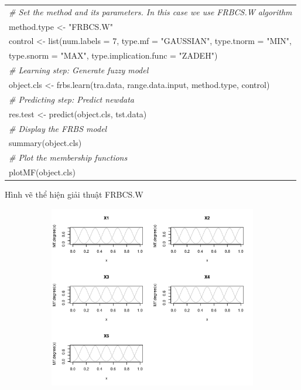 \documentclass[a4paper, 13pt]{report}
\begin{document}
\begin{enumerate}[label=\textbf{PL\arabic*}]
\begin{flushleft}
\begin{tabular}{  |l| }
\textit{\# Set the method and its parameters. In this case we use FRBCS.W algorithm}\\
method.type <- "FRBCS.W"\\
control <- list(num.labels = 7, type.mf = "GAUSSIAN", type.tnorm = "MIN",\\
\hspace{2.3cm}  type.snorm = "MAX", type.implication.func = "ZADEH")\\
\textit{\# Learning step: Generate fuzzy model}\\
object.cls <- frbs.learn(tra.data, range.data.input, method.type, control)\\
\textit{\# Predicting step: Predict newdata}\\
res.test <- predict(object.cls, tst.data)\\
\textit{\# Display the FRBS model}\\
summary(object.cls)\\
\textit{\# Plot the membership functions}\\
plotMF(object.cls)\\
\hline
\end{tabular}
\end{flushleft}
Hình vẽ thể hiện giải thuật FRBCS.W
\FloatBarrier
\begin{figure}[h!]
        \begin{subfigure}[b]{0.7\textwidth}
        		\label{tab:example2}
                \includegraphics[width=\linewidth]{FRBCSW}
        \end{subfigure}%

\end{figure}
\end{enumerate}
\end{document}

